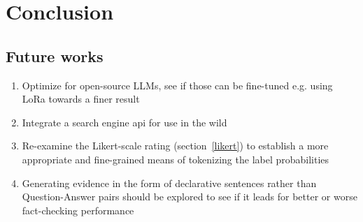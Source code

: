
\section{Conclusion}
\label{sec:conclusion}

\subsection{Future works}
\begin{enumerate}
    \item Optimize for open-source LLMs, see if those can be fine-tuned e.g. using LoRa towards a finer result
    \item Integrate a search engine api for use in the wild
    \item Re-examine the Likert-scale rating (section~\ref{likert}) to establish a more appropriate and fine-grained means of tokenizing the label probabilities
    \item Generating evidence in the form of declarative sentences rather than Question-Answer pairs should be explored to see if it leads for better or worse fact-checking performance
\end{enumerate}